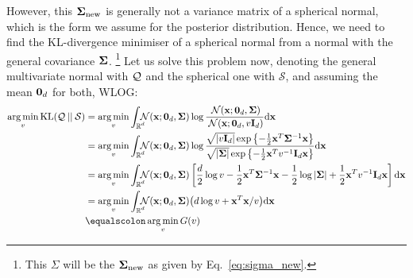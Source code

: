 \documentclass[11pt]{article}
\begin{document}
However, this $\mathbf{\Sigma}_{\text{new}}$ is generally not a variance 
matrix of a spherical normal, which is the form we assume for the 
posterior distribution.
Hence, we need to find the KL-divergence minimiser of a spherical normal 
from a normal with the general covariance $\mathbf{\Sigma}$.%
\footnote{This $\Sigma$ will be the $\mathbf{\Sigma_{\text{new}}}$ as given by 
Eq.~\eqref{eq:sigma_new}.} %
Let us solve this problem now, denoting the general multivariate normal 
with $\mathcal{Q}$ and the spherical one with $\mathcal{S}$, and assuming the mean 
$\mathbf{0}_d$ for both, WLOG:
\begin{align}
	\argmin_v \KL{\kve}{\mathcal{S}} &= %
	\argmin_v \intrcc
		\norm(\vek{x}; \vek{0}_d, \vek{\Sigma})
		\log \frac{\norm(\vek{x}; \vek{0}_d, \vek{\Sigma})}
							{\norm(\vek{x}; \vek{0}_d, v\unity_d)}  \byd \vek{x} \\
	&= \argmin_v \intrcc
		\norm(\vek{x}; \vek{0}_d, \vek{\Sigma})
		\log\frac{\sqrt{|v\unity_d|}\exp\left\{-\frac{1}{2}\vek{x}^T\vek{\Sigma}^{-1}\vek{x}\right\}}
		         {\sqrt{|\vek{\Sigma}|}\exp\left\{-\frac{1}{2}\vek{x}^T v^{-1}\unity_d \vek{x}\right\}}
						 \byd \vek{x} \\
	&= \argmin_v \intrcc
		\norm(\vek{x}; \vek{0}_d, \vek{\Sigma})
	\left[\frac{d}{2}\log v - \frac{1}{2}\vek{x}^T\vek{\Sigma}^{-1}\vek{x}
				- \frac{1}{2}\log|\vek{\Sigma}| + \frac{1}{2}\vek{x}^Tv^{-1}\unity_d \vek{x}
	\right]\byd \vek{x} \\
	&= \argmin_v \intrcc
		\norm(\vek{x}; \vek{0}_d, \vek{\Sigma})
		\big(d\log v + \vek{x}^T\vek{x}/v\big)\byd \vek{x} \\
	&\equalscolon \argmin_v G(v)
\end{align}
\end{document}
